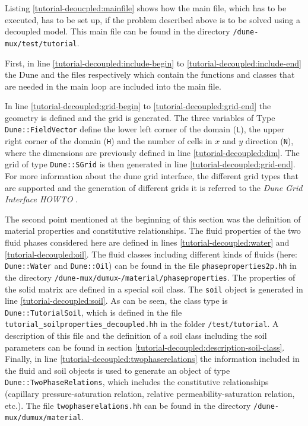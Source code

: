 Listing \ref{tutorial-deoucpled:mainfile} shows how the main file, which has to be executed, has to be set up, if the problem described above is to be solved using a decoupled model. This main file can be found in the directory \texttt{/dune-mux/test/tutorial}.

\begin{lst}\label{tutorial-deoucpled:mainfile} \mbox{}

\end{lst}

First, in line \ref{tutorial-decoupled:include-begin} to \ref{tutorial-decoupled:include-end} the Dune and the \Dumux files respectively which contain the functions and classes that are needed in the main loop are included into the main file.

In line \ref{tutorial-decoupled:grid-begin} to \ref{tutorial-decoupled:grid-end} the geometry is defined and the grid is generated. The three variables of Type \texttt{Dune::FieldVector} define the lower left corner of the domain (\texttt{L}), the upper right corner of the domain (\texttt{H}) and the number of cells in $x$ and $y$ direction (\texttt{N}), where the dimensions are previously defined in line \ref{tutorial-decoupled:dim}. The grid of type \texttt{Dune::SGrid} is then generated in line \ref{tutorial-decoupled:grid-end}. For more information about the dune grid interface, the different grid types that are supported and the generation of different grids it is referred to the \textit{Dune Grid Interface HOWTO} \cite{DUNE-HP} .

The second point mentioned at the beginning of this section was the definition of material properties and constitutive relationships. The fluid properties of the two fluid phases considered here are defined in lines \ref{tutorial-decoupled:water} and \ref{tutorial-decoupled:oil}. The fluid classes including different kinds of fluids (here: \texttt{Dune::Water} and \texttt{Dune::Oil}) can be found in the file \texttt{phaseproperties2p.hh} in the directory \texttt{/dune-mux/dumux}-\texttt{/material/phaseproperties}. The properties of the solid matrix are defined in a special soil class. The \texttt{soil} object is generated in line \ref{tutorial-decoupled:soil}. As can be seen, the class type is \texttt{Dune::TutorialSoil}, which is defined in the file \texttt{tutorial\_soilproperties\_decoupled.hh} in the folder \texttt{/test/tutorial}. A description of this file and the definition of a soil class including the soil parameters can be found in section \ref{tutorial-decoupled:description-soil-class}. Finally, in line \ref{tutorial-decoupled:twophaserelations} the information included in the fluid and soil objects is used to generate an object of type \texttt{Dune::TwoPhaseRelations}, which includes the constitutive relationships (capillary pressure-saturation relation, relative permeability-saturation relation, etc.). The file \texttt{twophaserelations.hh} can be found in the directory \texttt{/dune-mux/dumux/material}.


